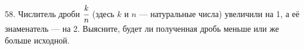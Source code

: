 58. Числитель дроби $\cfrac{k}{n}$ (здесь $k$ и $n$ --- натуральные числа) увеличили на 1, а её знаменатель --- на 2. Выясните, будет ли полученная дробь меньше или же больше исходной.\\

